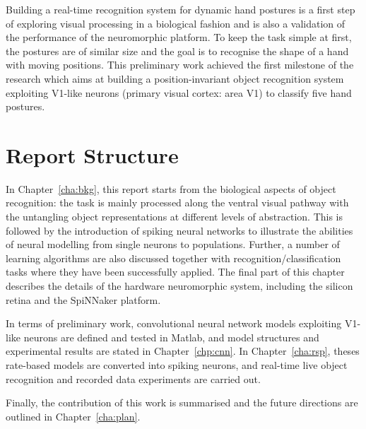 Building a real-time recognition system for dynamic hand postures is a first step of exploring visual processing in a biological fashion and is also a validation of the performance of the neuromorphic platform.
To keep the task simple at first, the postures are of similar size and the goal is to recognise the shape of a hand with moving positions.
This preliminary work achieved the first milestone of the research which aims at building a position-invariant object recognition system exploiting V1-like neurons (primary visual cortex: area V1) to classify five hand postures. 
\section{Report Structure}
\label{sec:str}
In Chapter~\ref{cha:bkg}, this report starts from the biological aspects of object recognition: the task is mainly processed along the ventral visual pathway with the untangling object representations at different levels of abstraction.
This is followed by the introduction of spiking neural networks to illustrate the abilities of neural modelling from single neurons to populations.
Further, a number of learning algorithms are also discussed together with recognition/classification tasks where they have been successfully applied.
The final part of this chapter describes the details of the hardware neuromorphic system, including the silicon retina and the SpiNNaker platform.

In terms of preliminary work, convolutional neural network models exploiting V1-like neurons are defined and tested in Matlab, and model structures and experimental results are stated in Chapter~\ref{chp:cnn}.
In Chapter~\ref{cha:rsp}, theses rate-based models are converted into spiking neurons, and real-time live object recognition and recorded data experiments are carried out.

Finally, the contribution of this work is summarised and the future directions are outlined in Chapter~\ref{cha:plan}.
